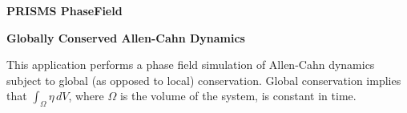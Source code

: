 \documentclass[10pt]{article}
\begin{document}
\def\Bomega{\mbox{\boldmath$\omega$}}
\def\Bvarepsilon{\mbox{\boldmath$\varepsilon$}}
\def\Bvartheta{\mbox{\boldmath$\vartheta$}}
\def\Bvarpi{\mbox{\boldmath$\varpi$}}
\def\Bvarrho{\mbox{\boldmath$\varrho$}}
\def\Bvarsigma{\mbox{\boldmath$\varsigma$}}
\def\Bvarphi{\mbox{\boldmath$\varphi$}}
\def\bone{\mathbf{1}}
\def\bzero{\mathbf{0}}
\def\bA{\mbox{\boldmath$ A$}}
\def\bB{\mbox{\boldmath$ B$}}
\def\bC{\mbox{\boldmath$ C$}}
\def\bD{\mbox{\boldmath$ D$}}
\def\bE{\mbox{\boldmath$ E$}}
\def\bF{\mbox{\boldmath$ F$}}
\def\bG{\mbox{\boldmath$ G$}}
\def\bH{\mbox{\boldmath$ H$}}
\def\bI{\mbox{\boldmath$ I$}}
\def\bJ{\mbox{\boldmath$ J$}}
\def\bK{\mbox{\boldmath$ K$}}
\def\bL{\mbox{\boldmath$ L$}}
\def\bM{\mbox{\boldmath$ M$}}
\def\bN{\mbox{\boldmath$ N$}}
\def\bO{\mbox{\boldmath$ O$}}
\def\bP{\mbox{\boldmath$ P$}}
\def\bQ{\mbox{\boldmath$ Q$}}
\def\bR{\mbox{\boldmath$ R$}}
\def\bS{\mbox{\boldmath$ S$}}
\def\bT{\mbox{\boldmath$ T$}}
\def\bU{\mbox{\boldmath$ U$}}
\def\bV{\mbox{\boldmath$ V$}}
\def\bW{\mbox{\boldmath$ W$}}
\def\bX{\mbox{\boldmath$ X$}}
\def\bY{\mbox{\boldmath$ Y$}}
\def\bZ{\mbox{\boldmath$ Z$}}
\def\ba{\mbox{\boldmath$ a$}}
\def\bb{\mbox{\boldmath$ b$}}
\def\bc{\mbox{\boldmath$ c$}}
\def\bd{\mbox{\boldmath$ d$}}
\def\be{\mbox{\boldmath$ e$}}
\def\bff{\mbox{\boldmath$ f$}}
\def\bg{\mbox{\boldmath$ g$}}
\def\bh{\mbox{\boldmath$ h$}}
\def\bi{\mbox{\boldmath$ i$}}
\def\bj{\mbox{\boldmath$ j$}}
\def\bk{\mbox{\boldmath$ k$}}
\def\bl{\mbox{\boldmath$ l$}}
\def\bm{\mbox{\boldmath$ m$}}
\def\bn{\mbox{\boldmath$ n$}}
\def\bo{\mbox{\boldmath$ o$}}
\def\bp{\mbox{\boldmath$ p$}}
\def\bq{\mbox{\boldmath$ q$}}
\def\br{\mbox{\boldmath$ r$}}
\def\bs{\mbox{\boldmath$ s$}}
\def\bt{\mbox{\boldmath$ t$}}
\def\bu{\mbox{\boldmath$ u$}}
\def\bv{\mbox{\boldmath$ v$}}
\def\bw{\mbox{\boldmath$ w$}}
\def\bx{\mbox{\boldmath$ x$}}
\def\by{\mbox{\boldmath$ y$}}
\def\bz{\mbox{\boldmath$ z$}}
\centerline{\Large{\bf PRISMS PhaseField}}
\smallskip
\centerline{\Large{\bf Globally Conserved Allen-Cahn Dynamics}}
\bigskip

This application performs a  phase field simulation of Allen-Cahn dynamics subject to global (as opposed to local) conservation. Global conservation implies that $\int_\Omega \eta \,dV$, where $\Omega$ is the volume of the system, is constant in time. \\
\end{document}
